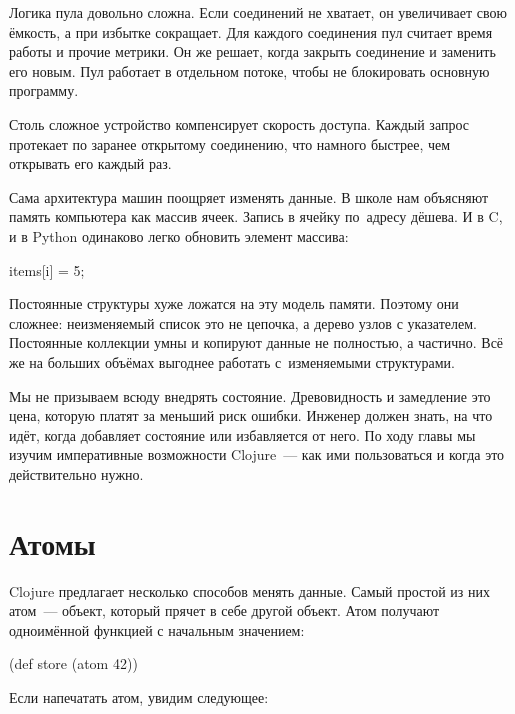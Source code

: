 Логика пула довольно сложна. Если соединений не хватает, он увеличивает свою
ёмкость, а при избытке сокращает. Для каждого соединения пул считает время
работы и прочие метрики. Он же решает, когда закрыть соединение и заменить его
новым. Пул работает в отдельном потоке, чтобы не блокировать основную программу.

Столь сложное устройство компенсирует скорость доступа. Каждый запрос протекает
по заранее открытому соединению, что намного быстрее, чем открывать его каждый
раз.

Сама архитектура машин поощряет изменять данные. В школе нам объясняют память
компьютера как массив ячеек. Запись в ячейку по~адресу дёшева. И в C\Plus\Plus,
и в Python одинаково легко обновить элемент массива:

\begin{english}
  \begin{python}
items[i] = 5;
  \end{python}
\end{english}

Постоянные структуры хуже ложатся на эту модель памяти. Поэтому они сложнее:
неизменяемый список это не цепочка, а дерево узлов с указателем. Постоянные
коллекции умны и копируют данные не полностью, а частично. Всё же на больших
объ\"{е}мах выгоднее работать с~изменяемыми структурами.

Мы не призываем всюду внедрять состояние. Древовидность и замедление это цена,
которую платят за меньший риск ошибки. Инженер должен знать, на что ид\"{е}т,
когда добавляет состояние или избавляется от него. По ходу главы мы изучим
императивные возможности Clojure~--- как ими пользоваться и когда это
действительно нужно.

\section{Атомы}


Clojure предлагает несколько способов менять данные. Самый простой из них
атом~--- объект, который прячет в себе другой объект. Атом получают
одноим\"{е}нной функцией с начальным значением:

\begin{english}
  \begin{clojure}
(def store (atom 42))
  \end{clojure}
\end{english}

\noindent
Если напечатать атом, увидим следующее:

